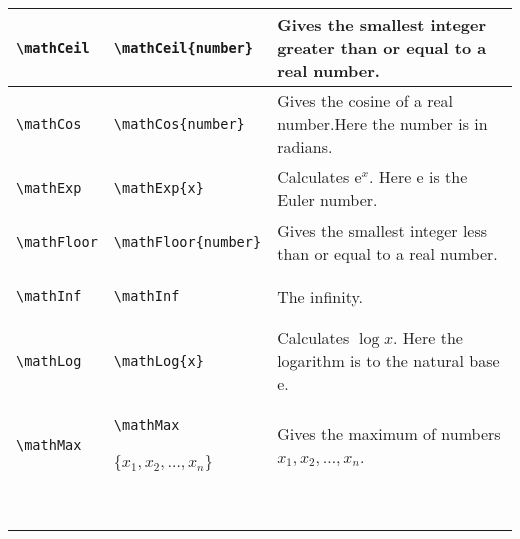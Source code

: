 \documentclass{article}
\begin{document}
\begin{center}
\begin{longtable}{llm{6.5cm}}
\begin{lstlisting}
\mathCeil
\end{lstlisting} &
\begin{lstlisting}
\mathCeil{number}
\end{lstlisting} & Gives the smallest integer greater than or equal to a real number.\\
\midrule
\begin{lstlisting}
\mathCos
\end{lstlisting} &
\begin{lstlisting}
\mathCos{number}
\end{lstlisting} & Gives the cosine of a real number.Here the number is in radians.\\
\midrule
\begin{lstlisting}
\mathExp
\end{lstlisting} &
\begin{lstlisting}
\mathExp{x}
\end{lstlisting} & Calculates \(\mathrm{e}^x \). Here \(\mathrm{e} \) is the Euler number.\\
\midrule
\begin{lstlisting}
\mathFloor
\end{lstlisting} &
\begin{lstlisting}
\mathFloor{number}
\end{lstlisting} & Gives the smallest integer less than or equal to a real number.\\
\midrule
\begin{lstlisting}
\mathInf
\end{lstlisting} & \begin{lstlisting}
\mathInf
\end{lstlisting} & The infinity.\\
\midrule
\begin{lstlisting}
\mathLog
\end{lstlisting} &
\begin{lstlisting}
\mathLog{x}
\end{lstlisting} & Calculates \(\log x \). Here the logarithm is to the natural base \(\mathrm{e} \).\\
\midrule
\begin{lstlisting}
\mathMax
\end{lstlisting} &
\begin{lstlisting}
\mathMax\end{lstlisting}\{\(x_1,x_2,\ldots,x_n\)\}
 & Gives the maximum of numbers \(x_1,x_2,\ldots,x_n\).\\
\midrule
\begin{lstlisting}

\end{lstlisting}
\end{longtable}
\end{center}
\end{document}

